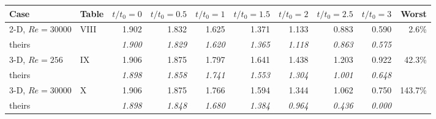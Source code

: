 \begin{tabular}{llrrrrrrrr}
\toprule
Case & Table & $t/t_0=0$ & $t/t_0=0.5$ & $t/t_0=1$ & $t/t_0=1.5$ & $t/t_0=2$ & $t/t_0=2.5$ & $t/t_0=3$ & Worst \\
\midrule
2-D, $Re=30000$ & VIII & 1.902 & 1.832 & 1.625 & 1.371 & 1.133 & 0.883 & 0.590 & 2.6\% \\
\quad theirs & & \textit{1.900} & \textit{1.829} & \textit{1.620} & \textit{1.365} & \textit{1.118} & \textit{0.863} & \textit{0.575} & \\
3-D, $Re=256$ & IX & 1.906 & 1.875 & 1.797 & 1.641 & 1.438 & 1.203 & 0.922 & 42.3\% \\
\quad theirs & & \textit{1.898} & \textit{1.858} & \textit{1.741} & \textit{1.553} & \textit{1.304} & \textit{1.001} & \textit{0.648} & \\
3-D, $Re=30000$ & X & 1.906 & 1.875 & 1.766 & 1.594 & 1.344 & 1.062 & 0.750 & 143.7\% \\
\quad theirs & & \textit{1.898} & \textit{1.848} & \textit{1.680} & \textit{1.384} & \textit{0.964} & \textit{0.436} & \textit{0.000} & \\
\bottomrule
\end{tabular}
